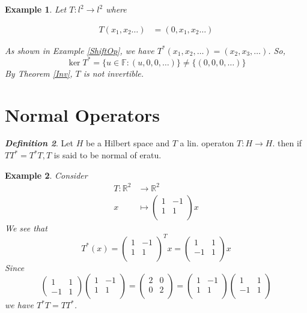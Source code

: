 \documentclass{report}
\newtheorem{exm}{Example}
\begin{document}
\begin{exm} \label{ShiftOpInv}
Let $T: l^{2} \rightarrow l^{2}$ where 

$$\begin{aligned} T\left(x_{1}, x_{2} \ldots\right) & =\left(0, x_{1}, x_{2} \ldots\right)   \end{aligned}$$

As shown in Example \ref{ShiftOp}, we have $T^{*}(x_{1},x_{2},\dots) = (x_{2},x_{3},\dots)$. So, $$\operatorname{ker}T^{*} = \{u\in\mathbb{F}: (u,0,0,\dots)\}\not=\{(0,0,0,\dots)\}$$ By Theorem \ref{Inv}, $T$ is not invertible.
\end{exm}

\section{Normal Operators}

\textbf{\textit{Definition 2}}. Let $H$ be a Hilbert space and $T$ a lin. operaton $T: H \rightarrow H$. then if $T T^{*}=T^{*} T, T$ is said to be normal of eratu.

\begin{exm}
  Consider
  $$
  \begin{aligned}
    T:\mathbb{R}^{2}&\longrightarrow\mathbb{R}^{2}\\
    x&\longmapsto\begin{pmatrix}1&-1\\1&1\\\end{pmatrix}x
  \end{aligned}
  $$
  We see that
  $$
    T^{*}(x) = \begin{pmatrix}1&-1\\1&1\\\end{pmatrix}^{T}x = \begin{pmatrix}1&1\\-1&1\\\end{pmatrix}x
  $$
  Since
  $$
    \begin{pmatrix}1&1\\-1&1\end{pmatrix}\begin{pmatrix}1&-1\\1&1\\\end{pmatrix} = \begin{pmatrix}2&0\\0&2\\\end{pmatrix} = \begin{pmatrix}1&-1\\1&1\\\end{pmatrix}\begin{pmatrix}1&1\\-1&1\\\end{pmatrix}
  $$
  we have $T^{*}T=TT^{*}$.
\end{exm}
\end{document}
